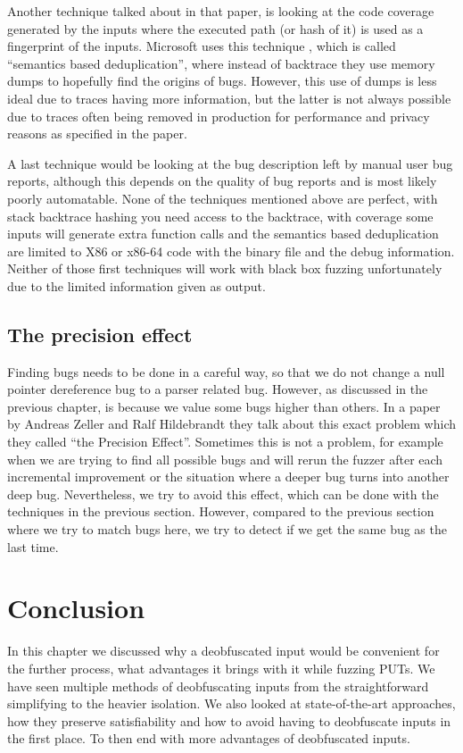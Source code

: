 Another technique talked about in that paper, is looking at the code coverage generated by the inputs where the executed path (or hash of it) is used as a fingerprint of the inputs. Microsoft uses this technique \cite{36semanticsAwareDeduplicationRETracer} , which is called “semantics based deduplication”, where instead of backtrace they use memory dumps to hopefully find the origins of bugs. However, this use of dumps is less ideal due to traces having more information, but the latter is not always possible due to traces often being removed in production for performance and privacy reasons as specified in the paper. 

A last technique would be looking at the bug description left by manual user bug reports, although this depends on the quality of bug reports and is most likely poorly automatable.
None of the techniques mentioned above are perfect, with stack backtrace hashing you need access to the backtrace, with coverage some inputs will generate extra function calls and the semantics based deduplication are limited to X86 or x86-64 code with the binary file and the debug information. Neither of those first techniques will work with black box fuzzing unfortunately due to the limited information given as output.

\subsection{The precision effect}
\label{inputReduction:PersisionEffect}
Finding bugs needs to be done in a careful way, so that we do not change a null pointer dereference bug to a parser related bug. However, as discussed in the previous chapter, is because we value some bugs higher than others. 
In a paper by Andreas Zeller and Ralf Hildebrandt \cite{5zeller2002simplifyingIsolatingFailure-inducing} they talk about this exact problem which they called “the Precision Effect”. Sometimes this is not a problem, for example when we are trying to find all possible bugs and will rerun the fuzzer after each incremental improvement or the situation where a deeper bug turns into another deep bug. Nevertheless, we try to avoid this effect, which can be done with the techniques in the previous section. However, compared to the previous section where we try to match bugs here, we try to detect if we get the same bug as the last time.

\section{Conclusion}
\label{inputReduction:Conclusion}
In this chapter we discussed why a deobfuscated input would be convenient for the further process, what advantages it brings with it while fuzzing PUTs. We have seen multiple methods of deobfuscating inputs from the straightforward simplifying to the heavier isolation. We also looked at state-of-the-art approaches, how they preserve satisfiability and how to avoid having to deobfuscate inputs in the first place. To then end with more advantages of deobfuscated inputs.

